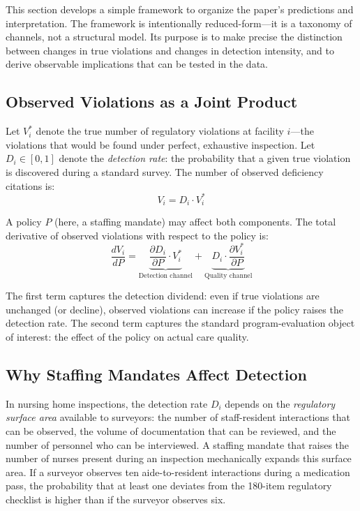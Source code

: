 \documentclass[12pt]{article}
\begin{document}
This section develops a simple framework to organize the paper's predictions and interpretation. The framework is intentionally reduced-form---it is a taxonomy of channels, not a structural model. Its purpose is to make precise the distinction between changes in true violations and changes in detection intensity, and to derive observable implications that can be tested in the data.

\subsection{Observed Violations as a Joint Product}

Let $V^*_i$ denote the true number of regulatory violations at facility $i$---the violations that would be found under perfect, exhaustive inspection. Let $D_i \in [0,1]$ denote the \textit{detection rate}: the probability that a given true violation is discovered during a standard survey. The number of observed deficiency citations is:
\begin{equation}
V_i = D_i \cdot V^*_i
\label{eq:observed}
\end{equation}

A policy $P$ (here, a staffing mandate) may affect both components. The total derivative of observed violations with respect to the policy is:
\begin{equation}
\frac{dV_i}{dP} = \underbrace{\frac{\partial D_i}{\partial P} \cdot V^*_i}_{\text{Detection channel}} + \underbrace{D_i \cdot \frac{\partial V^*_i}{\partial P}}_{\text{Quality channel}}
\label{eq:decomposition}
\end{equation}

The first term captures the detection dividend: even if true violations are unchanged (or decline), observed violations can increase if the policy raises the detection rate. The second term captures the standard program-evaluation object of interest: the effect of the policy on actual care quality.

\subsection{Why Staffing Mandates Affect Detection}

In nursing home inspections, the detection rate $D_i$ depends on the \textit{regulatory surface area} available to surveyors: the number of staff-resident interactions that can be observed, the volume of documentation that can be reviewed, and the number of personnel who can be interviewed. A staffing mandate that raises the number of nurses present during an inspection mechanically expands this surface area. If a surveyor observes ten aide-to-resident interactions during a medication pass, the probability that at least one deviates from the 180-item regulatory checklist is higher than if the surveyor observes six.
\end{document}
